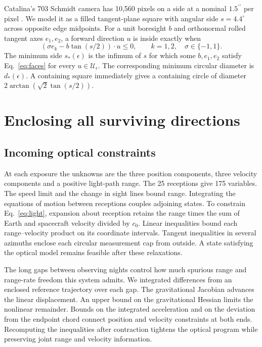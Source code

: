 \documentclass[10pt,letterpaper]{article}
\newcommand{\degc}{^{\circ}}
\newcommand{\as}{^{\prime\prime}}
\newcommand{\dotp}{\mathbin{\cdot}}
\begin{document}
Catalina's 703 Schmidt camera has 10,560 pixels on a side at a nominal $1.5\as$ per pixel \cite{camera}. We model it as a filled tangent-plane square with angular side $s=4.4\degc$ across opposite edge midpoints. For a unit boresight $b$ and orthonormal rolled tangent axes $e_1,e_2$, a forward direction $u$ is inside exactly when
\begin{equation}
 (\sigma e_k-b\tan(s/2))\dotp u\leq 0,\qquad k=1,2,\quad \sigma\in\{-1,1\}.
 \label{eq:faces}
\end{equation}
The minimum side $s_*(\epsilon)$ is the infimum of $s$ for which some $b,e_1,e_2$ satisfy Eq.~\eqref{eq:faces} for every $u\in\mathcal U_\epsilon$. The corresponding minimum circular diameter is $d_*(\epsilon)$. A containing square immediately gives a containing circle of diameter $2\arctan(\sqrt{2}\tan(s/2))$.

\section{Enclosing all surviving directions}

\subsection{Incoming optical constraints}
At each exposure the unknowns are the three position components, three velocity components and a positive light-path range. The 25 receptions give 175 variables. The speed limit and the change in sight lines bound range. Integrating the equations of motion between receptions couples adjoining states. To constrain Eq.~\eqref{eq:light}, expansion about reception retains the range times the sum of Earth and spacecraft velocity divided by $c_0$. Linear inequalities bound each range--velocity product on its coordinate intervals. Tangent inequalities in several azimuths enclose each circular measurement cap from outside. A state satisfying the optical model remains feasible after these relaxations.

The long gaps between observing nights control how much spurious range and range-rate freedom this system admits. We integrated differences from an enclosed reference trajectory over each gap. The gravitational Jacobian advances the linear displacement. An upper bound on the gravitational Hessian limits the nonlinear remainder. Bounds on the integrated acceleration and on the deviation from the endpoint chord connect position and velocity constraints at both ends. Recomputing the inequalities after contraction tightens the optical program while preserving joint range and velocity information.
\end{document}
